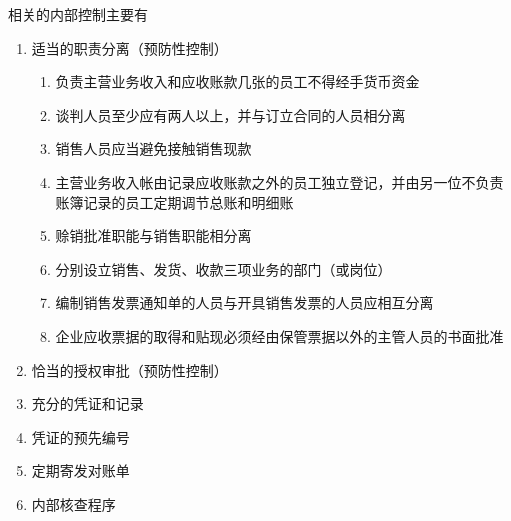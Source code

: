 \documentclass[UTF8,12pt]{ctexart}
\numberwithin{equation}{section} %
\numberwithin{figure}{section}
\numberwithin{table}{section}
\begin{document}
	相关的内部控制主要有
	\begin{enumerate}
		\item 适当的职责分离（预防性控制）
		\begin{enumerate}
			\item 负责主营业务收入和应收账款几张的员工不得经手货币资金
			
			\item 谈判人员至少应有两人以上，并与订立合同的人员相分离
			
			\item 销售人员应当避免接触销售现款
			
			\item 主营业务收入帐由记录应收账款之外的员工独立登记，并由另一位不负责账簿记录的员工定期调节总账和明细账
			
			\item 赊销批准职能与销售职能相分离
			
			\item 分别设立销售、发货、收款三项业务的部门（或岗位）
			
			\item 编制销售发票通知单的人员与开具销售发票的人员应相互分离
			
			\item 企业应收票据的取得和贴现必须经由保管票据以外的主管人员的书面批准
		\end{enumerate}
		
		\item 恰当的授权审批（预防性控制）
		
		\item 充分的凭证和记录
		
		\item 凭证的预先编号
		
		\item 定期寄发对账单
		
		\item 内部核查程序
	\end{enumerate}
	
\end{document}
